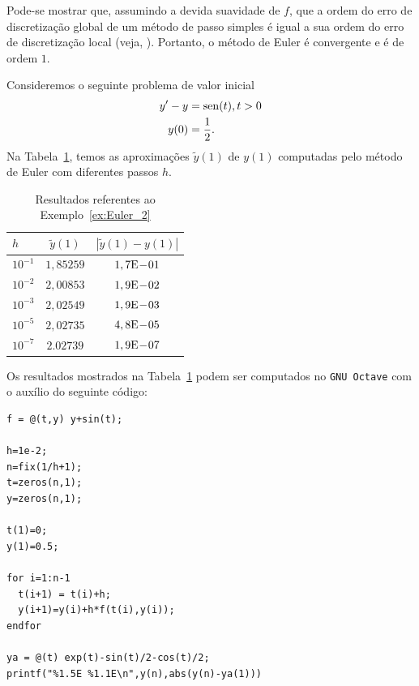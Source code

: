 \begin{obs}
  Pode-se mostrar que, assumindo a devida suavidade de $f$, que a ordem do erro de discretização global de um método de passo simples é igual a sua ordem do erro de discretização local (veja, \cite[Cap. 7, Seç. 7.2]{Stoer1993a}). Portanto, o método de Euler é convergente e é de ordem $1$.
\end{obs}

\begin{ex}\label{ex:Euler_2}
  Consideremos o seguinte problema de valor inicial
  \begin{align}
    y' - y &= \operatorname{sen}(t), t>0\label{eq:Euler_aux2}\\
    y(0) &= \frac{1}{2}.
  \end{align}
  Na Tabela~\ref{tab:ex_Euler_2}, temos as aproximações $\tilde{y}(1)$ de $y(1)$ computadas pelo método de Euler com diferentes passos $h$.
 
  \begin{table}[h!]
    \centering
    \begin{tabular}{l|cc}
      $h$ & $\tilde{y}(1)$ & $|\tilde{y}(1)-y(1)|$\\\hline
      $10^{-1}$ & $1,85259$ & $1,7\mathrm{E}\!-\!01$ \\
      $10^{-2}$ & $2,00853$ & $1,9\mathrm{E}\!-\!02$ \\
      $10^{-3}$ & $2,02549$ & $1,9\mathrm{E}\!-\!03$ \\
      $10^{-5}$ & $2,02735$ & $4,8\mathrm{E}\!-\!05$ \\
      $10^{-7}$ & $2.02739$ & $1,9\mathrm{E}\!-\!07$ \\\hline
    \end{tabular}
    \caption{Resultados referentes ao Exemplo~\ref{ex:Euler_2}}
    \label{tab:ex_Euler_2}
  \end{table}

\ifisoctave
Os resultados mostrados na Tabela~\ref{tab:ex_Euler_2} podem ser computados no \verb+GNU Octave+ com o auxílio do seguinte código:
\begin{verbatim}
f = @(t,y) y+sin(t);

h=1e-2;
n=fix(1/h+1);
t=zeros(n,1);
y=zeros(n,1);

t(1)=0;
y(1)=0.5;

for i=1:n-1
  t(i+1) = t(i)+h;
  y(i+1)=y(i)+h*f(t(i),y(i));
endfor

ya = @(t) exp(t)-sin(t)/2-cos(t)/2;
printf("%1.5E %1.1E\n",y(n),abs(y(n)-ya(1)))
\end{verbatim}
\fi
\end{ex}

